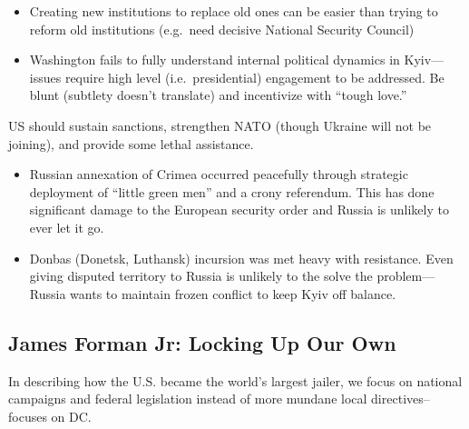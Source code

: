 \documentclass[
]{article}
\begin{document}
\begin{itemize}
\item
  Creating new institutions to replace old ones can be easier than
  trying to reform old institutions (e.g.~need decisive National
  Security Council)
\item
  Washington fails to fully understand internal political dynamics in
  Kyiv---issues require high level (i.e.~presidential) engagement to be
  addressed. Be blunt (subtlety doesn't translate) and incentivize with
  ``tough love.''
\end{itemize}

US should sustain sanctions, strengthen NATO (though Ukraine will not be
joining), and provide some lethal assistance.

\begin{itemize}
\item
  Russian annexation of Crimea occurred peacefully through strategic
  deployment of ``little green men'' and a crony referendum. This has
  done significant damage to the European security order and Russia is
  unlikely to ever let it go.
\item
  Donbas (Donetsk, Luthansk) incursion was met heavy with resistance.
  Even giving disputed territory to Russia is unlikely to the solve the
  problem---Russia wants to maintain frozen conflict to keep Kyiv off
  balance.
\end{itemize}

\hypertarget{james-forman-jr-locking-up-our-own}{%
\subsection{James Forman Jr: Locking Up Our
Own}\label{james-forman-jr-locking-up-our-own}}

In describing how the U.S. became the world's largest jailer, we focus
on national campaigns and federal legislation instead of more mundane
local directives--focuses on DC.
\end{document}
